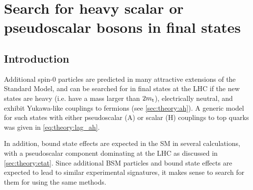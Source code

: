 \chapter{Search for heavy scalar or pseudoscalar bosons in \ttbartitle final states}
\label{ch:ah}

\section{Introduction}
\label{sec:ah:intro}

Additional spin-0 particles are predicted in many attractive extensions of the Standard Model, and can be searched for in \ttbar final states at the LHC if the new states are heavy (i.e. have a mass larger than $2m_{\mathrm{t}}$), electrically neutral, and exhibit Yukawa-like couplings to fermions (see \cref{sec:theory:ah}). A generic model for such states with either pseudoscalar (A) or scalar (H) couplings to top quarks was given in \cref{eq:theory:lag_ah}.

In addition, \ttbar bound state effects are expected in the SM in several calculations, with a pseudoscalar component dominating at the LHC as discussed in \cref{sec:theory:etat}. 
Since additional BSM particles and bound state effects are expected to lead to similar experimental signatures, it makes sense to search for them for using the same methods.




